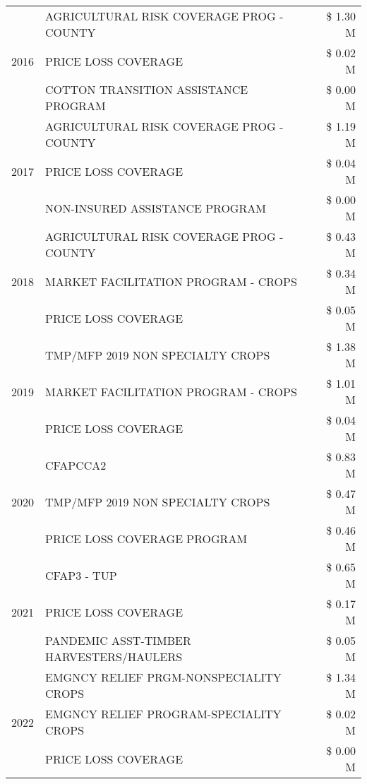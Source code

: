\begin{tabular}{llr}
\cline{1-3}
\multirow[t]{3}{*}{2016} & AGRICULTURAL RISK COVERAGE PROG - COUNTY & \$ 1.30 M \\
 & PRICE LOSS COVERAGE & \$ 0.02 M \\
 & COTTON TRANSITION ASSISTANCE PROGRAM & \$ 0.00 M \\
\cline{1-3}
\multirow[t]{3}{*}{2017} & AGRICULTURAL RISK COVERAGE PROG - COUNTY & \$ 1.19 M \\
 & PRICE LOSS COVERAGE & \$ 0.04 M \\
 & NON-INSURED ASSISTANCE PROGRAM & \$ 0.00 M \\
\cline{1-3}
\multirow[t]{3}{*}{2018} & AGRICULTURAL RISK COVERAGE PROG - COUNTY & \$ 0.43 M \\
 & MARKET FACILITATION PROGRAM - CROPS & \$ 0.34 M \\
 & PRICE LOSS COVERAGE & \$ 0.05 M \\
\cline{1-3}
\multirow[t]{3}{*}{2019} & TMP/MFP 2019 NON SPECIALTY CROPS & \$ 1.38 M \\
 & MARKET FACILITATION PROGRAM - CROPS & \$ 1.01 M \\
 & PRICE LOSS COVERAGE & \$ 0.04 M \\
\cline{1-3}
\multirow[t]{3}{*}{2020} & CFAPCCA2 & \$ 0.83 M \\
 & TMP/MFP 2019 NON SPECIALTY CROPS & \$ 0.47 M \\
 & PRICE LOSS COVERAGE PROGRAM & \$ 0.46 M \\
\cline{1-3}
\multirow[t]{3}{*}{2021} & CFAP3 - TUP & \$ 0.65 M \\
 & PRICE LOSS COVERAGE & \$ 0.17 M \\
 & PANDEMIC ASST-TIMBER HARVESTERS/HAULERS & \$ 0.05 M \\
\cline{1-3}
\multirow[t]{3}{*}{2022} & EMGNCY RELIEF PRGM-NONSPECIALITY CROPS & \$ 1.34 M \\
 & EMGNCY RELIEF PROGRAM-SPECIALITY CROPS & \$ 0.02 M \\
 & PRICE LOSS COVERAGE & \$ 0.00 M \\
\cline{1-3}
\bottomrule
\end{tabular}
